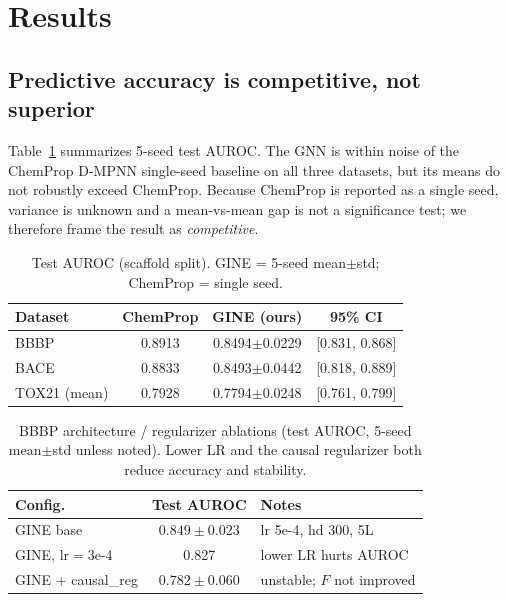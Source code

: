 \documentclass[a4paper,fleqn]{cas-dc}
\newcommand{\BBBPauc}{0.8494}
\newcommand{\BBBPaucsd}{0.0229}
\newcommand{\BACEauc}{0.8493}
\newcommand{\BACEaucsd}{0.0442}
\newcommand{\TOXauc}{0.7794}
\newcommand{\TOXaucsd}{0.0248}
\newcommand{\ChemBBBP}{0.8913}
\newcommand{\ChemBACE}{0.8833}
\newcommand{\ChemTOX}{0.7928}
\begin{document}
\section{Results}
\subsection{Predictive accuracy is competitive, not superior}
Table~\ref{tab:auroc} summarizes 5-seed test AUROC. The GNN is within noise of the ChemProp D-MPNN single-seed baseline on all three datasets, but its means do not robustly exceed ChemProp. Because ChemProp is reported as a single seed, variance is unknown and a mean-vs-mean gap is not a significance test; we therefore frame the result as \emph{competitive}.

\begin{table}[t]
\centering
\caption{Test AUROC (scaffold split). GINE = 5-seed mean$\pm$std; ChemProp = single seed.}
\label{tab:auroc}
\begin{tabular}{@{}l c c c@{}}
\toprule
Dataset & ChemProp & GINE (ours) & 95\% CI \\
\midrule
BBBP & \ChemBBBP & \BBBPauc$\pm$\BBBPaucsd & [0.831, 0.868] \\
BACE & \ChemBACE & \BACEauc$\pm$\BACEaucsd & [0.818, 0.889] \\
TOX21 (mean) & \ChemTOX & \TOXauc$\pm$\TOXaucsd & [0.761, 0.799] \\
\bottomrule
\end{tabular}
\end{table}

\begin{table}[t]
\centering
\caption{BBBP architecture / regularizer ablations (test AUROC, 5-seed mean$\pm$std unless noted). Lower LR and the causal regularizer both reduce accuracy and stability.}
\label{tab:abl}
\begin{tabular}{@{}l c l@{}}
\toprule
Config. & Test AUROC & Notes \\
\midrule
GINE base & $0.849\pm0.023$ & lr 5e-4, hd 300, 5L \\
GINE, lr$=$3e-4 & 0.827 & lower LR hurts AUROC \\
GINE + causal\_reg & $0.782\pm0.060$ & unstable; $F$ not improved \\
\bottomrule
\end{tabular}
\end{table}
\end{document}
